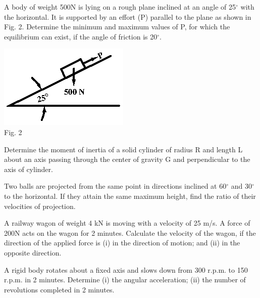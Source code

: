 \item A body of weight 500N is lying on a rough plane inclined at an angle of 25$^\circ$ with
  the horizontal. It is supported by an effort (P) parallel to the plane as shown in Fig. 2. Determine
  the minimum and maximum values of P, for which the equilibrium can exist, if the angle of friction is 20$^\circ$.

  \begin{center}
  
    \includegraphics[scale=2]{src/s1s2/en/09_105/fig2}\\
    Fig. 2
    
    
  \end{center}



\newpage

\again

\item Determine the moment of inertia of a solid cylinder of radius R and length L about an axis passing
  through the center of gravity G and perpendicular to the axis of cylinder.

\item Two balls are projected from the same point in directions inclined at 60$^\circ$ and 30$^\circ$ to the
  horizontal. If they attain the same maximum height, find the ratio of their velocities of projection.

\item A railway wagon of weight 4 kN is moving with a velocity of 25 m/s. A force of 200N acts on the
  wagon for 2 minutes. Calculate the velocity of the wagon, if the direction of the applied force is
  (i) in the direction of motion; and (ii) in the opposite direction.

\item A rigid body rotates about a fixed axis and slows down from 300 r.p.m. to 150 r.p.m. in 2 minutes.
  Determine (i) the angular acceleration; (ii) the number of revolutions completed in 2 minutes.

\markB

\partCo

